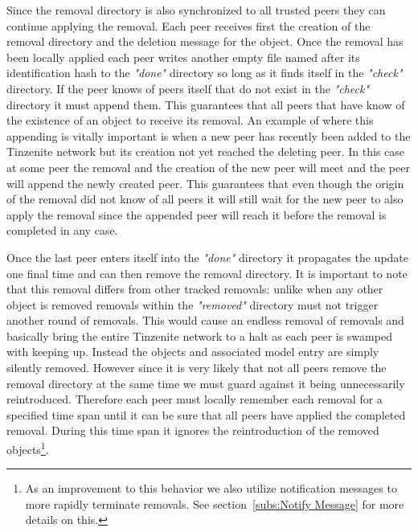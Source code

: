 Since the removal directory is also synchronized to all trusted peers they can continue applying the removal.
Each peer receives first the creation of the removal directory and the deletion message for the object.
Once the removal has been locally applied each peer writes another empty file named after its identification hash to the \textit{"done"} directory so long as it finds itself in the \textit{"check"} directory.
If the peer knows of peers itself that do not exist in the \textit{"check"} directory it must append them.
This guarantees that all peers that have know of the existence of an object to receive its removal.
An example of where this appending is vitally important is when a new peer has recently been added to the Tinzenite network but its creation not yet reached the deleting peer.
In this case at some peer the removal and the creation of the new peer will meet and the peer will append the newly created peer.
This guarantees that even though the origin of the removal did not know of all peers it will still wait for the new peer to also apply the removal since the appended peer will reach it before the removal is completed in any case.

Once the last peer enters itself into the \textit{"done"} directory it propagates the update one final time and can then remove the removal directory.
It is important to note that this removal differs from other tracked removals: unlike when any other object is removed removals within the \textit{"removed"} directory must not trigger another round of removals.
This would cause an endless removal of removals and basically bring the entire Tinzenite network to a halt as each peer is swamped with keeping up.
Instead the objects and associated model entry are simply silently removed.
However since it is very likely that not all peers remove the removal directory at the same time we must guard against it being unnecessarily reintroduced.
Therefore each peer must locally remember each removal for a specified time span until it can be sure that all peers have applied the completed removal.
During this time span it ignores the reintroduction of the removed objects\footnote{As an improvement to this behavior we also utilize notification messages to more rapidly terminate removals. See section~\ref{subs:Notify Message} for more details on this.}.

